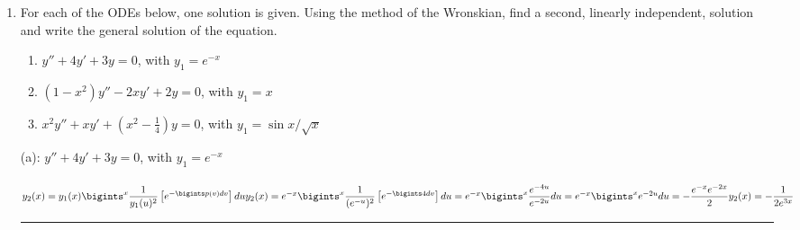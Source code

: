\documentclass[fleqn]{article}
\begin{document}
\begin{enumerate}
    \item  For each of the ODEs below, one solution is given. Using the method of the Wronskian, find a second, linearly independent, solution and write the general solution of the equation. 
      \begin{enumerate}
      \item $y'' + 4 y' + 3 y =0 $, with $y_1= e^{-x}$

      \item $(1-x^2) y'' - 2 x y' + 2y=0 $, with $y_1= x$

      \item $x^2 y'' + x y' + (x^2 - \frac{1}{4})y=0 $, with $y_1=\sin x/\sqrt{x}$
      \end{enumerate}

      \textcolor{hwColor}{
        (a): $y''+4y'+3 y =0$, with $y_1=e^{-x}$ \\
        \\
        $
          y_2(x)=y_1(x) \bigints_{}^{x} \dfrac{1}{y_1(u)^2}\left[e^{-\bigints p(v)dv}\right]du \\
          \\
          y_2(x)=e^{-x} \bigints_{}^{x} \dfrac{1}{(e^{-u})^2}\left[e^{-\bigints 4dv}\right]du=e^{-x} \bigints_{}^{x} \dfrac{e^{-4u}}{e^{-2u}}du=e^{-x} \bigints_{}^{x} e^{-2u}du=-\dfrac{e^{-x} e^{-2x}}{2} \\
          \\
          y_2(x)=-\dfrac{1}{2e^{3x}}
        $
      }

      \textcolor{hwColor}{
        \rule{15cm}{1pt}
      }


\end{enumerate}
\end{document}
